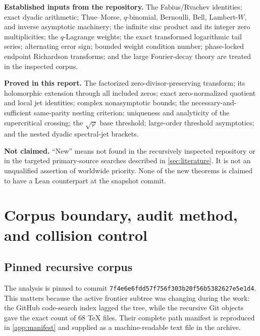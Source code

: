 \documentclass[11pt,oneside]{article}
\numberwithin{equation}{section}
\theoremstyle{frontier}
\theoremstyle{definition}
\theoremstyle{remark}
\newcommand{\commitsha}{\nolinkurl{7f4e6e6fdd57f756f303b20f56b5382627e5e1d4}}
\begin{document}
\begin{statusbox}
\textbf{Established inputs from the repository.}  The Fabius/Rvachev identities; exact
dyadic arithmetic; Thue--Morse, $q$-binomial, Bernoulli, Bell, Lambert-$W$, and inverse
asymptotic machinery; the infinite sinc product and its integer zero multiplicities; the
$q$-Lagrange weights; the exact transformed logarithmic tail series; alternating error
sign; bounded weight condition number; phase-locked endpoint Richardson transforms; and the
large Fourier-decay theory are treated in the inspected corpus.

\textbf{Proved in this report.}  The factorized zero-divisor-preserving transform; its
holomorphic extension through all included zeros; exact zero-normalized quotient and local
jet identities; complex nonasymptotic bounds; the necessary-and-sufficient same-parity
nesting criterion; uniqueness and analyticity of the supercritical crossing; the
$\sqrt\varphi$ base threshold; large-order threshold asymptotics; and the nested dyadic
spectral-jet brackets.

\textbf{Not claimed.}  ``New'' means not found in the recursively inspected repository or
in the targeted primary-source searches described in \cref{sec:literature}.  It is not an
unqualified assertion of worldwide priority.  None of the new theorems is claimed to have
a Lean counterpart at the snapshot commit.
\end{statusbox}

\clearpage
\tableofcontents
\clearpage
{}

\section{Corpus boundary, audit method, and collision control}\label{sec:audit}

\subsection{Pinned recursive corpus}

The analysis is pinned to commit \commitsha.  This matters because the active frontier
subtree was changing during the work: the GitHub code-search index lagged the tree, while the
recursive Git objects gave the exact count of 68 TeX files.  Their complete path manifest is
reproduced in \cref{app:manifest} and supplied as a machine-readable text file in the
archive.
\end{document}
